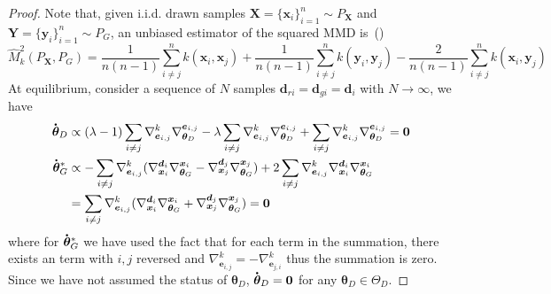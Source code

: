 \documentclass{article} %
\theoremstyle{plain}
\newtheorem*{proposition 1*}{Proposition 1}
\newcommand{\rdv}[1]{\mathbf{#1}}  %
\newcommand*{\dt}[1]{%
	\accentset{\mbox{\large\bfseries .}}{#1}}
\begin{document}
\begin{appendices}
\begin{proof}
	Note that, given i.i.d. drawn samples \(\bm{X}=\{\bm{x}_i\}_{i=1}^n\sim P_{\rdv{X}}\) and \(\bm{Y}=\{\bm{y}_i\}_{i=1}^n\sim P_{G}\), an unbiased estimator of the squared MMD is~(\cite{mmdtest})
	\begin{equation}\label{Eq:mmd_unbiased}
	\hat{M}_k^2(P_{\rdv{X}},P_{G})=\frac{1}{n(n-1)}\sum_{i\ne j}^{n}k(\bm{x}_i,\bm{x}_j)+\frac{1}{n(n-1)}\sum_{i\ne j}^{n}k(\bm{y}_i,\bm{y}_j)-\frac{2}{n(n-1)}\sum_{i\ne j}^{n}k(\bm{x}_i,\bm{y}_j)
	\end{equation}
	At equilibrium, consider a sequence of \(N\) samples \(\bm{d}_{ri}=\bm{d}_{gi}=\bm{d}_{i}\) with \(N\to\infty\), we have
	\begin{align*}
	\dt{\bm{\theta}}_D &\propto (\lambda-1)\sum_{i\ne j}\nabla_{\bm{e}_{i,j}}^k\nabla_{\bm{\theta}_D}^{\bm{e}_{i,j}} - 
	\lambda\sum_{i\ne j}\nabla_{\bm{e}_{i,j}}^k\nabla_{\bm{\theta}_D}^{\bm{e}_{i,j}} +
	\sum_{i\ne j}\nabla_{\bm{e}_{i,j}}^k\nabla_{\bm{\theta}_D}^{\bm{e}_{i,j}}=\bm{0} \\
	\dt{\bm{\theta}}_G^* &\propto
	-\sum_{i\ne j}\nabla_{\bm{e}_{i,j}}^k(\nabla_{\bm{x}_{i}}^{\bm{d}_{i}}\nabla_{\bm{\theta}_{G}}^{\bm{x}_{i}}-\nabla_{\bm{x}_{j}}^{\bm{d}_{j}}\nabla_{\bm{\theta}_{G}}^{\bm{x}_{j}}) +
	2\sum_{i\ne j}\nabla_{\bm{e}_{i,j}}^k\nabla_{\bm{x}_{i}}^{\bm{d}_{i}}\nabla_{\bm{\theta}_{G}}^{\bm{x}_{i}} \\
	& =
	\sum_{i\ne j}\nabla_{\bm{e}_{i,j}}^k(\nabla_{\bm{x}_{i}}^{\bm{d}_{i}}\nabla_{\bm{\theta}_{G}}^{\bm{x}_{i}}+\nabla_{\bm{x}_{j}}^{\bm{d}_{j}}\nabla_{\bm{\theta}_{G}}^{\bm{x}_{j}}) = \bm{0}
	\end{align*}
	where for \(\dt{\bm{\theta}}_G^*\) we have used the fact that for each term in the summation, there exists an term with \(i,j\) reversed and \(\nabla_{\bm{e}_{i,j}}^k=-\nabla_{\bm{e}_{j,i}}^k\) thus the summation is zero. Since we have not assumed the status of \(\bm{\theta}_D\), \(\dt{\bm{\theta}}_D=\bm{0}\) for any \(\bm{\theta}_D\in\Theta_D\).
\end{proof}


\end{appendices}
\end{document}
